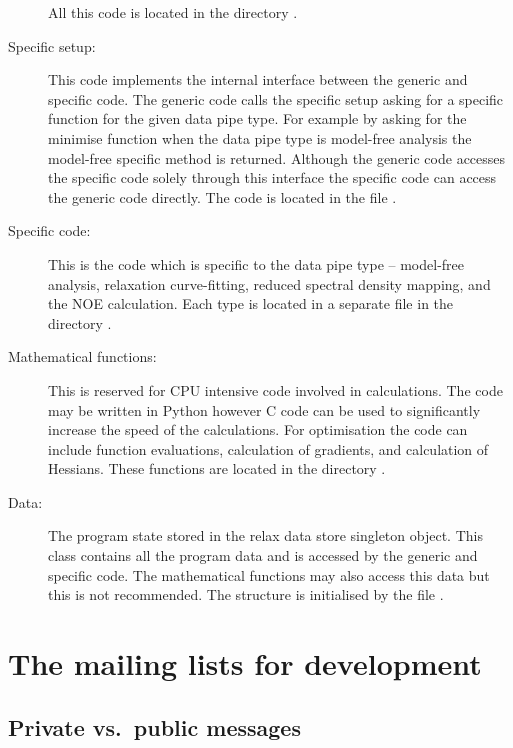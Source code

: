 \begin{description}
    All this code is located in the directory .
  \item[Specific setup:]  This code implements the internal interface between the generic and specific code.
    The generic code calls the specific setup asking for a specific function for the given data pipe type.
    For example by asking for the minimise function when the data pipe type is model-free analysis the model-free specific  method is returned.
    Although the generic code accesses the specific code solely through this interface the specific code can access the generic code directly.
    The code is located in the file .
  \item[Specific code:]  This is the code which is specific to the data pipe type -- model-free analysis, relaxation curve-fitting, reduced spectral density mapping, and the NOE calculation.
    Each type is located in a separate file in the directory .
  \item[Mathematical functions:]  This is reserved for CPU intensive code involved in calculations.
    The code may be written in Python however C code can be used to significantly increase the speed of the calculations.
    For optimisation the code can include function evaluations, calculation of gradients, and calculation of Hessians.
    These functions are located in the directory .
  \item[Data:]  The program state stored in the relax data store singleton object.
    This class contains all the program data and is accessed by the generic and specific code.
    The mathematical functions may also access this data but this is not recommended.  The structure is initialised by the file .
\end{description}





\section{The mailing lists for development}


\subsection{Private vs.\ public messages}


